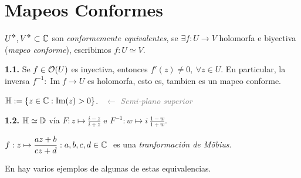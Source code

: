 \setcounter{section}{7}
\section{Mapeos Conformes}
 
\begin{definition}
    \(U\ab, V \ab \subset \C\) son \emph{conformemente equivalentes}, se \(\exists f : U \to V \)  holomorfa e biyectiva (\emph{mapeo conforme}), escribimos \(f: U \simeq V \).  
\end{definition}

\begin{proposition}
    \textbf{1.1.} Se \(f \in \mathcal{O}(U)\) es inyectiva, entonces \(f'(z) \neq 0, \ \forall z \in U\). En particular, la inversa \(f^{-1}: \operatorname{Im}f \to U\) es holomorfa, esto es, tambien es un mapeo conforme. 
\end{proposition}


\begin{definition}
    \centering \(\mathbb{H}:= \{z \in \mathbb{C} : \operatorname{Im}(z)>0\}\). \ \textcolor{gray}{\(\leftarrow\) \emph{Semi-plano superior}}
\end{definition}

\newcommand{\Ha}{\mathbb{H}}
\begin{theorem}
    \textbf{1.2.} \(\Ha \simeq \D\) vía \(\displaystyle F:  z \mapsto \frac{i-z}{i+z}\) e \(\displaystyle F^{-1}: w \mapsto i\  \frac{1-w}{1 + w} \). 
\end{theorem}

\begin{definition}
    \(\displaystyle f : z \mapsto \frac{az + b}{cz + d} : a,b,c,d \in \mathbb{C} \ \) es una \emph{tranformación de Möbius}.
\end{definition}

\begin{note}
    En \cite[pags. 208-213]{stein} hay varios ejemplos de algunas de estas equivalencias. 
\end{note}

